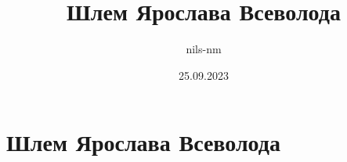 
\title{Шлем Ярослава Всеволода}
\author{nils-nm}
\date{25.09.2023}



\begin{frame}
\maketitle
\end{frame}

\section{Шлем Ярослава Всеволода}

